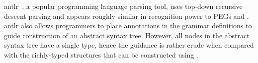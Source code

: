 {\sc antlr}~\cite{antlr}, a popular programming language parsing tool, 
uses top-down recursive descent
parsing and appears roughly similar in recognition power to PEGs and \ddc.
{\sc antlr} also allows programmers to place annotations
in the grammar definitions to guide construction of an abstract syntax
tree. However, all nodes in the abstract syntax tree have a 
single type, hence the guidance is rather crude when compared with
the richly-typed structures that can be constructed using
\ddc.





